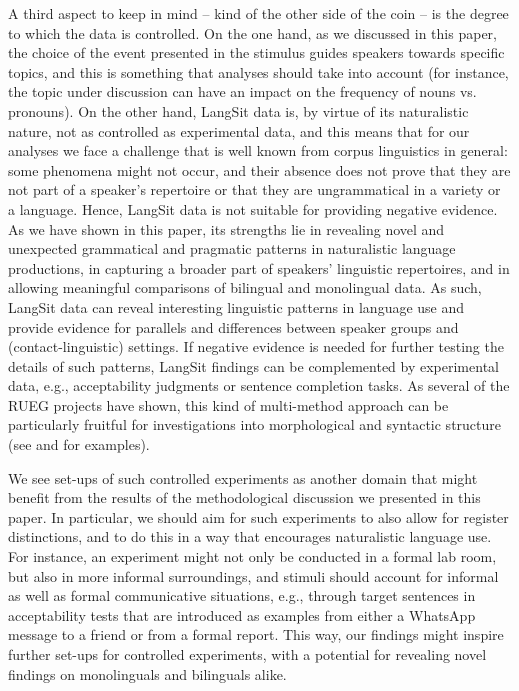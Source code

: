 \documentclass[output=paper,colorlinks,citecolor=brown]{langscibook}
\begin{document}
A third aspect to keep in mind – kind of the other side of the coin – is the degree to which the data is controlled. On the one hand, as we discussed in this paper, the choice of the event presented in the stimulus guides speakers towards specific topics, and this is something that analyses should take into account (for instance, the topic under discussion can have an impact on the frequency of nouns vs. pronouns). On the other hand, LangSit data is, by virtue of its naturalistic nature, not as controlled as experimental data, and this means that for our analyses we face a challenge that is well known from corpus linguistics in general: some phenomena might not occur, and their absence does not prove that they are not part of a speaker’s repertoire or that they are ungrammatical in a variety or a language. Hence, LangSit data is not suitable for providing negative evidence. As we have shown in this paper, its strengths lie in revealing novel and unexpected grammatical and pragmatic patterns in naturalistic language productions, in capturing a broader part of speakers’ linguistic repertoires, and in allowing meaningful comparisons of bilingual and monolingual data. As such, LangSit data can reveal interesting linguistic patterns in language use and provide evidence for parallels and differences between speaker groups and (contact-linguistic) settings. If negative evidence is needed for further testing the details of such patterns, LangSit findings can be complemented by experimental data, e.g., acceptability judgments or sentence completion tasks. As several of the RUEG projects have shown, this kind of multi-method approach can be particularly fruitful for investigations into morphological and syntactic structure (see  and  for examples).

We see set-ups of such controlled experiments as another domain that might benefit from the results of the methodological discussion we presented in this paper. In particular, we should aim for such experiments to also allow for register distinctions, and to do this in a way that encourages naturalistic language use. For instance, an experiment might not only be conducted in a formal lab room, but also in more informal surroundings, and stimuli should account for informal as well as formal communicative situations, e.g., through target sentences in acceptability tests that are introduced as examples from either a WhatsApp message to a friend or from a formal report. This way, our findings might inspire further set-ups for controlled experiments, with a potential for revealing novel findings on monolinguals and bilinguals alike.
\end{document}
